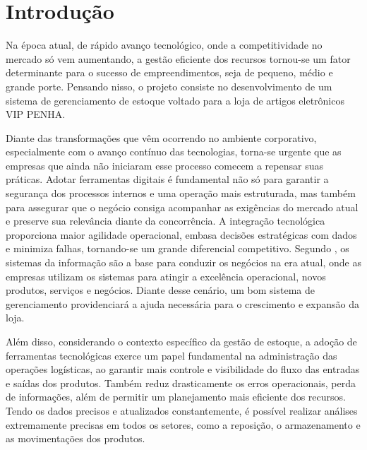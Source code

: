 \documentclass[
	12pt,				%
	openany,			%
	twoside,			%
	a4paper,			%
	english,			%
	brazil				%
	]{abntex2}
\begin{document}
\textual

\chapter{Introdução}

Na época atual, de rápido avanço tecnológico, onde a competitividade no mercado só vem aumentando, a gestão eficiente dos recursos tornou-se um fator determinante para o sucesso de empreendimentos, seja de pequeno, médio e grande porte. Pensando nisso, o projeto consiste no desenvolvimento de um sistema de gerenciamento de estoque voltado para a loja de artigos eletrônicos VIP PENHA.

Diante das transformações que vêm ocorrendo no ambiente corporativo, especialmente com o avanço contínuo das tecnologias, torna-se urgente que as empresas que ainda não iniciaram esse processo comecem a repensar suas práticas. Adotar ferramentas digitais é fundamental não só para garantir a segurança dos processos internos e uma operação mais estruturada, mas também para assegurar que o negócio consiga acompanhar as exigências do mercado atual e preserve sua relevância diante da concorrência. A integração tecnológica proporciona maior agilidade operacional, embasa decisões estratégicas com dados e minimiza falhas, tornando-se um grande diferencial competitivo. Segundo   , os sistemas da informação são a base para conduzir os negócios na era atual, onde as empresas utilizam os sistemas para atingir a excelência operacional, novos produtos, serviços e negócios. Diante desse cenário, um bom sistema de gerenciamento providenciará a ajuda necessária para o crescimento e expansão da loja.

Além disso, considerando o contexto específico da gestão de estoque, a adoção de ferramentas tecnológicas exerce um papel fundamental na administração das operações logísticas, ao garantir mais controle e visibilidade do fluxo das entradas e saídas dos produtos. Também reduz drasticamente os erros operacionais, perda de informações, além de permitir um planejamento mais eficiente dos recursos. Tendo os dados precisos e atualizados constantemente, é possível realizar análises extremamente precisas em todos os setores, como a reposição, o armazenamento e as movimentações dos produtos.
\end{document}

